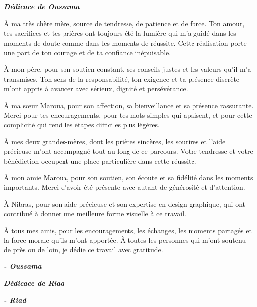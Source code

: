 
\begin{center}
\textbf{\textit{\large Dédicace de Oussama}}
\end{center}

\begingroup
\itshape

À ma très chère mère, source de tendresse, de patience et de force. Ton amour, tes sacrifices et tes prières ont toujours été la lumière qui m'a guidé dans les moments de doute comme dans les moments de réussite. Cette réalisation porte une part de ton courage et de ta confiance inépuisable.

À mon père, pour son soutien constant, ses conseils justes et les valeurs qu'il m'a transmises. Ton sens de la responsabilité, ton exigence et ta présence discrète m'ont appris à avancer avec sérieux, dignité et persévérance.

À ma sœur Maroua, pour son affection, sa bienveillance et sa présence rassurante. Merci pour tes encouragements, pour tes mots simples qui apaisent, et pour cette complicité qui rend les étapes difficiles plus légères.

À mes deux grandes-mères, dont les prières sincères, les sourires et l'aide précieuse m'ont accompagné tout au long de ce parcours. Votre tendresse et votre bénédiction occupent une place particulière dans cette réussite.

À mon amie Maroua, pour son soutien, son écoute et sa fidélité dans les moments importants. Merci d'avoir été présente avec autant de générosité et d'attention.

À Nibras, pour son aide précieuse et son expertise en design graphique, qui ont contribué à donner une meilleure forme visuelle à ce travail.

À tous mes amis, pour les encouragements, les échanges, les moments partagés et la force morale qu'ils m'ont apportée. À toutes les personnes qui m'ont soutenu de près ou de loin, je dédie ce travail avec gratitude.

\endgroup

\vspace{1.5em}
\begin{flushright}
\textbf{\textit{\large{- Oussama}}}
\end{flushright}

\clearpage

\begin{center}
\textbf{\textit{\large Dédicace de Riad}}
\end{center}

\vspace*{0.72\textheight}

\begin{flushright}
\textbf{\textit{\large{- Riad}}}
\end{flushright}

\clearpage
